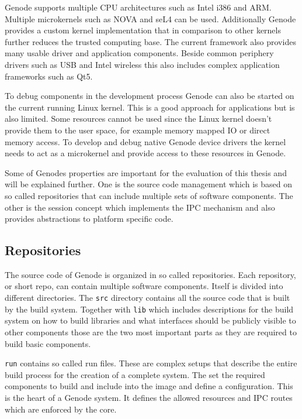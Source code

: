 \documentclass[
a4paper,
12pt,
notitlepage,
parskip=half,
DIV=11,
]{scrbook}
\begin{document}
		Genode supports multiple CPU architectures such as Intel i386 and ARM.
		Multiple microkernels such as NOVA and seL4 can be used.
		Additionally Genode provides a custom kernel implementation that in comparison to other kernels further reduces the trusted computing base.
		The current framework also provides many usable driver and application components.
		Beside common periphery drivers such as USB and Intel wireless this also includes complex application frameworks such as Qt5. \citep{genode}
		
		To debug components in the development process Genode can also be started on the current running Linux kernel.
		This is a good approach for applications but is also limited.
		Some resources cannot be used since the Linux kernel doesn't provide them to the user space, for example memory mapped IO or direct memory access.
		To develop and debug native Genode device drivers the kernel needs to act as a microkernel and provide access to these resources in Genode.
		
		Some of Genodes properties are important for the evaluation of this thesis and will be explained further.
		One is the source code management which is based on so called repositories that can include multiple sets of software components.
		The other is the session concept which implements the IPC mechanism and also provides abstractions to platform specific code.
		
		\subsection{Repositories}
		\label{repos}
		
		The source code of Genode is organized in so called repositories.
		Each repository, or short repo, can contain multiple software components.
		Itself is divided into different directories.
		The \texttt{src} directory contains all the source code that is built by the build system.
		Together with \texttt{lib} which includes descriptions for the build system on how to build libraries and what interfaces should be publicly visible to other components those are the two most important parts as they are required to build basic components.
		
		\texttt{run} contains so called run files.
		These are complex setups that describe the entire build process for the creation of a complete system.
		The set the required components to build and include into the image and define a configuration.
		This is the heart of a Genode system.
		It defines the allowed resources and IPC routes which are enforced by the core.
		
\end{document}
